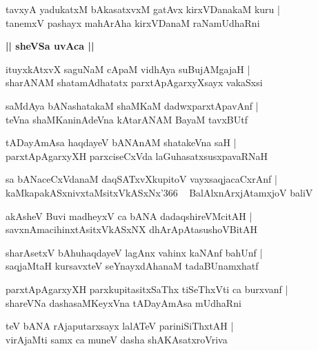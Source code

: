 \documentclass[twoside,12pt,openright]{book}
\newcounter{shloka}[chapter]
\def\uvaca#1{\centerline{{\large\textbf{#1}}}}
\begin{document}
\begin{shloka}%
tavxyA yadukatxM bAkasatxvxM gatAvx kirxVDanakaM kuru |\\
tanemxV pashayx mahArAha kirxVDanaM raNamUdhaRni
\end{shloka}

\uvaca{|| sheVSa uvAca ||}

\begin{shloka}%
ituyxkAtxvX saguNaM cApaM vidhAya suBujAMgajaH |\\
sharANAM shatamAdhatatx parxtApAgarxyXsayx vakaSxsi 
\end{shloka}

\begin{shloka}%
saMdAya bANashatakaM shaMKaM dadwxparxtApavAnf |\\
teVna shaMKaninAdeVna kAtarANAM BayaM tavxBUtf 
\end{shloka}

\begin{shloka}%
tADayAmAsa haqdayeV bANAnAM shatakeVna saH |\\
parxtApAgarxyXH parxciseCxVda laGuhasatxsusxpavaRNaH
\end{shloka}

\begin{shloka}%
sa bANaceCxVdanaM daqSATxvXkupitoV vayxsaqjacaCxrAnf |\\
kaMkapakASxnivxtaMsitxVkASxNx\char'366 ~ BalAlxnArxjAtamxjoV baliV 
\end{shloka}

\begin{shloka}%
akAsheV Buvi madheyxV ca bANA dadaqshireVMcitAH |\\
savxnAmacihinxtAsitxVkASxNX dhArApAtasushoVBitAH 
\end{shloka}

\begin{shloka}%
sharAsetxV bAhuhaqdayeV lagAnx vahinx kaNAnf bahUnf |\\
saqjaMtaH kursavxteV seYnayxdAhanaM tadaBUnamxhatf 
\end{shloka}

\begin{shloka}%
parxtApAgarxyXH parxkupitasitxSaThx tiSeThxVti ca burxvanf |\\
shareVNa dashasaMKeyxVna tADayAmAsa mUdhaRni
\end{shloka}

\begin{shloka}%
teV bANA rAjaputarxsayx lalATeV pariniSiThxtAH |\\
virAjaMti samx ca muneV dasha shAKAsatxroVriva 
\end{shloka}
\end{document}
